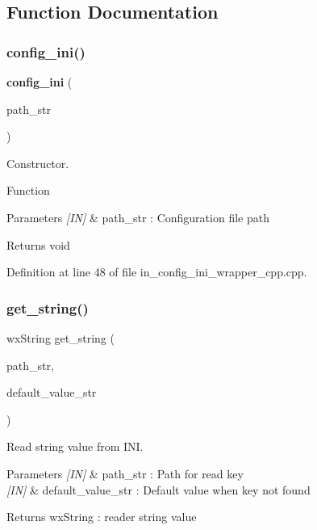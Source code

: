 \subsection{Function Documentation}
\mbox{\label{group__configuration_gae9a9021586a9be51eb71a360fa34cd27}} 
\subsubsection{config\_ini()}
{\footnotesize\ttfamily \textbf{ config\+\_\+ini} (\begin{DoxyParamCaption}\item[{wx\+String}]{path\+\_\+str }\end{DoxyParamCaption})}



Constructor. 

Function
\begin{DoxyParams}{Parameters}
{\em \mbox{[}\+I\+N\mbox{]}} & path\+\_\+str \+: Configuration file path \\
\hline
\end{DoxyParams}
\begin{DoxyReturn}{Returns}
void 
\end{DoxyReturn}


Definition at line 48 of file in\+\_\+config\+\_\+ini\+\_\+wrapper\+\_\+cpp.\+cpp.

\mbox{\label{group__configuration_ga86c5d4545e94818033b9ea210c239c76}} 
\subsubsection{get\_string()}
{\footnotesize\ttfamily wx\+String get\+\_\+string (\begin{DoxyParamCaption}\item[{wx\+String}]{path\+\_\+str,  }\item[{wx\+String}]{default\+\_\+value\+\_\+str }\end{DoxyParamCaption})}



Read string value from I\+NI. 


\begin{DoxyParams}{Parameters}
{\em \mbox{[}\+I\+N\mbox{]}} & path\+\_\+str \+: Path for read key \\
\hline
{\em \mbox{[}\+I\+N\mbox{]}} & default\+\_\+value\+\_\+str \+: Default value when key not found \\
\hline
\end{DoxyParams}
\begin{DoxyReturn}{Returns}
wx\+String \+: reader string value 
\end{DoxyReturn}


